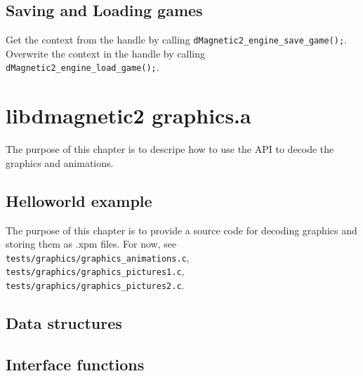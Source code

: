 \documentclass{report}
\begin{document}
\section{Saving and Loading games}
Get the context from the handle by calling \verb+dMagnetic2_engine_save_game();+. Overwrite the context in the handle by calling \verb+dMagnetic2_engine_load_game();+.

\chapter{libdmagnetic2 graphics.a}
The purpose of this chapter is to descripe how to use the API to decode the graphics and animations.
\section{Helloworld example}
The purpose of this chapter is to provide a source code for decoding graphics and storing them as .xpm files.
For now, see \verb+tests/graphics/graphics_animations.c+, \verb+tests/graphics/graphics_pictures1.c+, \verb+tests/graphics/graphics_pictures2.c+.
\section{Data structures}
\section{Interface functions}
\end{document}
